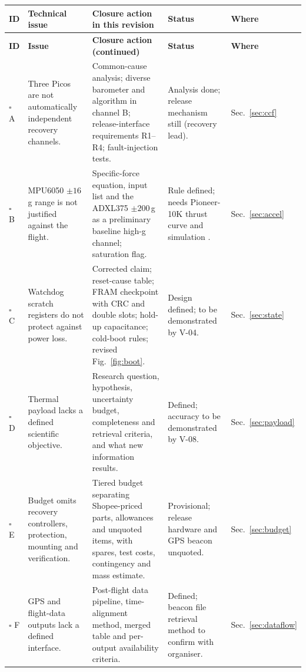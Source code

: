 \small
{}
\begin{longtable}{@{}L{8mm}L{36mm}L{56mm}L{28mm}L{18mm}@{}}
\toprule{}\textbf{ID}&\textbf{Technical issue}&\textbf{Closure action in this revision}&\textbf{Status}&\textbf{Where}\\\midrule\endfirsthead
\toprule{}\textbf{ID}&\textbf{Issue}&\textbf{Closure action (continued)}&\textbf{Status}&\textbf{Where}\\\midrule\endhead
\bottomrule\endlastfoot
$\square$ A & Three Picos are not automatically independent recovery channels. & Common-cause analysis; diverse barometer and algorithm in channel B; release-interface requirements R1--R4; fault-injection tests. & Analysis done; release mechanism still  (recovery lead). & Sec.~\ref{sec:ccf}\\
$\square$ B & MPU6050 $\pm16$\,g range is not justified against the flight. & Specific-force equation, input list and the ADXL375 $\pm200$\,g as a preliminary baseline high-g channel; saturation flag. & Rule defined; needs Pioneer-10K thrust curve and simulation . & Sec.~\ref{sec:accel}\\
$\square$ C & Watchdog scratch registers do not protect against power loss. & Corrected claim; reset-cause table; FRAM checkpoint with CRC and double slots; hold-up capacitance; cold-boot rules; revised Fig.~\ref{fig:boot}. & Design defined; to be demonstrated by V-04. & Sec.~\ref{sec:state}\\
$\square$ D & Thermal payload lacks a defined scientific objective. & Research question, hypothesis, uncertainty budget, completeness and retrieval criteria, and what new information results. & Defined; accuracy to be demonstrated by V-08. & Sec.~\ref{sec:payload}\\
$\square$ E & Budget omits recovery controllers, protection, mounting and verification. & Tiered budget separating Shopee-priced parts, allowances and unquoted items, with spares, test costs, contingency and mass estimate. & Provisional; release hardware and GPS beacon unquoted. & Sec.~\ref{sec:budget}\\
$\square$ F & GPS and flight-data outputs lack a defined interface. & Post-flight data pipeline, time-alignment method, merged table and per-output availability criteria. & Defined; beacon file retrieval method to confirm with organiser. & Sec.~\ref{sec:dataflow}\\
\end{longtable}
\normalsize

